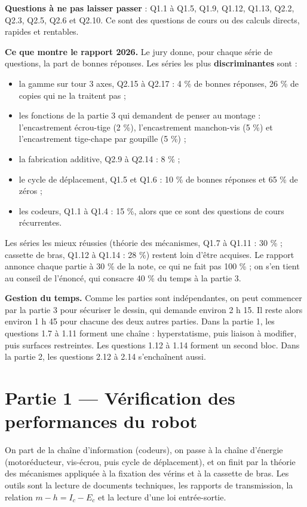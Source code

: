 \documentclass[11pt,a4paper]{article}
\providecommand{\tightlist}{\setlength{\itemsep}{0pt}\setlength{\parskip}{0pt}}
\begin{document}
\textbf{Questions à ne pas laisser passer} : Q1.1 à Q1.5, Q1.9, Q1.12, Q1.13, Q2.2, Q2.3, Q2.5, Q2.6 et Q2.10. Ce sont des questions de cours ou des calculs directs, rapides et rentables.

\textbf{Ce que montre le rapport 2026.} Le jury donne, pour chaque série de questions, la part de bonnes réponses. Les séries les plus \textbf{discriminantes} sont :

\begin{itemize}
\tightlist
\item
  la gamme sur tour 3 axes, Q2.15 à Q2.17 : 4 \% de bonnes réponses, 26 \% de copies qui ne la traitent pas ;
\item
  les fonctions de la partie 3 qui demandent de penser au montage : l'encastrement écrou-tige (2 \%), l'encastrement manchon-vis (5 \%) et l'encastrement tige-chape par goupille (5 \%) ;
\item
  la fabrication additive, Q2.9 à Q2.14 : 8 \% ;
\item
  le cycle de déplacement, Q1.5 et Q1.6 : 10 \% de bonnes réponses et 65 \% de zéros ;
\item
  les codeurs, Q1.1 à Q1.4 : 15 \%, alors que ce sont des questions de cours récurrentes.
\end{itemize}

Les séries les mieux réussies (théorie des mécanismes, Q1.7 à Q1.11 : 30 \% ; cassette de bras, Q1.12 à Q1.14 : 28 \%) restent loin d'être acquises. Le rapport annonce chaque partie à 30 \% de la note, ce qui ne fait pas 100 \% ; on s'en tient au conseil de l'énoncé, qui consacre 40 \% du temps à la partie 3.

\textbf{Gestion du temps.} Comme les parties sont indépendantes, on peut commencer par la partie 3 pour sécuriser le dessin, qui demande environ 2 h 15. Il reste alors environ 1 h 45 pour chacune des deux autres parties. Dans la partie 1, les questions 1.7 à 1.11 forment une chaîne : hyperstatisme, puis liaison à modifier, puis surfaces restreintes. Les questions 1.12 à 1.14 forment un second bloc. Dans la partie 2, les questions 2.12 à 2.14 s'enchaînent aussi.

\hypertarget{partie-1-vuxe9rification-des-performances-du-robot}{%
\section{Partie 1 --- Vérification des performances du robot}\label{partie-1-vuxe9rification-des-performances-du-robot}}

On part de la chaîne d'information (codeurs), on passe à la chaîne d'énergie (motoréducteur, vis-écrou, puis cycle de déplacement), et on finit par la théorie des mécanismes appliquée à la fixation des vérins et à la cassette de bras. Les outils sont la lecture de documents techniques, les rapports de transmission, la relation \(m - h = I_c - E_c\) et la lecture d'une loi entrée-sortie.
\end{document}
